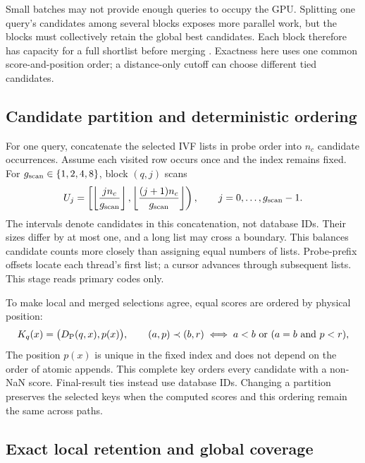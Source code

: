 Small batches may not provide enough queries to occupy the GPU. Splitting
one query's candidates among several blocks exposes more parallel work,
but the blocks must collectively retain the global best candidates.
Each block therefore has capacity for a full shortlist before merging
\cite{johnson_gpu}. Exactness here uses one common score-and-position
order; a distance-only cutoff can choose different tied candidates.

\subsection{Candidate partition and deterministic ordering}

For one query, concatenate the selected IVF lists in probe order into
$n_c$ candidate occurrences. Assume each visited row occurs once and
the index remains fixed. For $g_{\mathrm{scan}}\in\{1,2,4,8\}$, block $(q,j)$ scans
\begin{equation}
 U_j=\left[\left\lfloor\frac{j n_c}{g_{\mathrm{scan}}}\right\rfloor,
              \left\lfloor\frac{(j+1)n_c}{g_{\mathrm{scan}}}\right\rfloor\right),
 \qquad j=0,\ldots,g_{\mathrm{scan}}-1.
 \label{eq:5-partition}
\end{equation}
The intervals denote candidates in this concatenation, not database IDs.
Their sizes differ by at most one, and a long list may cross a boundary.
This balances candidate counts more closely than assigning equal numbers
of lists. Probe-prefix offsets locate each thread's first list; a cursor
advances through subsequent lists. This stage reads primary codes only.

To make local and merged selections agree, equal scores are ordered by
physical position:
\begin{equation}
 K_q(x)=\bigl(D_{\mathrm{P}}(q,x),p(x)\bigr),
 \qquad
 (a,p)\prec(b,r)\iff a<b\ \text{or}\ (a=b\ \text{and}\ p<r),
 \label{eq:5-primary-key}
\end{equation}
The position $p(x)$ is unique in the fixed index and does not depend on
the order of atomic appends. This complete key orders every candidate
with a non-NaN score. Final-result ties instead use database IDs.
Changing a partition preserves the selected keys when the computed
scores and this ordering remain the same across paths.

\subsection{Exact local retention and global coverage}

